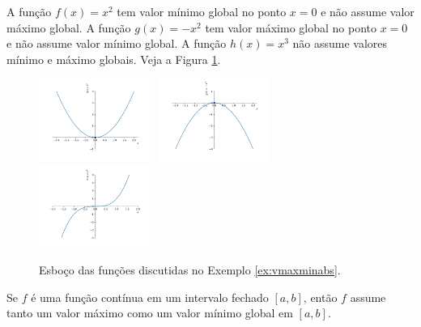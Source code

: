 \begin{ex}\label{ex:vmaxminabs}
  A função $f(x) = x^2$ tem valor mínimo global no ponto $x=0$ e não assume valor máximo global. A função $g(x) = -x^2$ tem valor máximo global no ponto $x=0$ e não assume valor mínimo global. A função $h(x)=x^3$ não assume valores mínimo e máximo globais. Veja a Figura \ref{fig:ex_vmaxminabs}.

  \begin{figure}[H]
    \centering
    \includegraphics[width=0.32\textwidth]{./cap_apderiv/dados/fig_ex_vmaxminabs/fig_f}~
    \includegraphics[width=0.32\textwidth]{./cap_apderiv/dados/fig_ex_vmaxminabs/fig_g}~
    \includegraphics[width=0.32\textwidth]{./cap_apderiv/dados/fig_ex_vmaxminabs/fig_h}
    \caption{Esboço das funções discutidas no Exemplo \ref{ex:vmaxminabs}.}
    \label{fig:ex_vmaxminabs}
  \end{figure}
\end{ex}

\begin{teo}
  Se $f$ é uma função contínua em um intervalo fechado $[a, b]$, então $f$ assume tanto um valor máximo como um valor mínimo global em $[a, b]$.
\end{teo}

